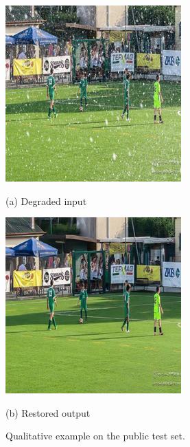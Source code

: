 \documentclass{article}
\begin{document}
\begin{figure}[ht]
  \centering
  \begin{minipage}{0.45\linewidth}
    \includegraphics[width=\linewidth]{original_test_0.png}
    \caption*{(a) Degraded input}
  \end{minipage}\hfill
  \begin{minipage}{0.45\linewidth}
    \includegraphics[width=\linewidth]{predicted_clean_0.png}
    \caption*{(b) Restored output}
  \end{minipage}
  \caption{Qualitative example on the public test set.}
  \label{fig:qual}
\end{figure}
\end{document}
